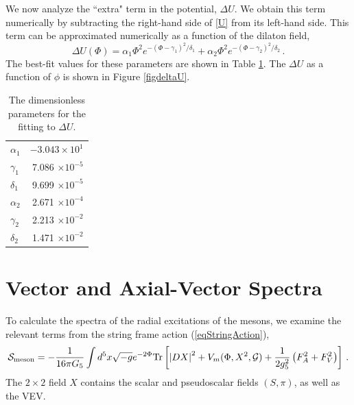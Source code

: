 \documentclass[aps,prd,12pt,nofootinbib]{revtex4}
\newcommand{\be}{\begin{equation}}
\newcommand{\ee}{\end{equation}}
\newcommand{\cS}{\mathcal S}
\begin{document}
We now analyze the ``extra" term in the potential, $\Delta U$. 
We obtain this term numerically by subtracting the right-hand side of \ref{U} from its left-hand side.
This term can be approximated numerically as a function of the dilaton field, 
\be
\Delta U\left(\Phi\right) = \alpha_1 \Phi^2 e^{-\left(\Phi-\gamma_1\right)^2/\delta_1 } +   \alpha_2 \Phi^2 e^{-\left(\Phi-\gamma_2\right)^2/\delta_2 } \, .
\label{eqFit}
\ee
The best-fit values for these parameters are shown in Table \ref{deltaUfit}.  The $\Delta U$ as a function of $\phi$ is shown in Figure \ref{figdeltaU}.
\begin{table}[htb]
\begin{center}
\begin{tabular}{| l | r | }
\hline
$\alpha_1$ & $-3.043 \times 10^1$\\
$\gamma_1$ & 7.086 $\times 10^{-5}$ \\ 
$\delta_1$ & 9.699 $ \times 10^{-5}$\\ 
$\alpha_2$ & 2.671 $ \times 10^{-4}$  \\
$\gamma_2$ & 2.213 $ \times 10^{-2}$ \\
$\delta_2$ & 1.471 $ \times 10^{-2} $\\
  \hline
\end{tabular}
\caption{The dimensionless parameters for the fitting to $\Delta U$.}
\label{deltaUfit}
\end{center}
\end{table}


\section{Vector and Axial-Vector Spectra}

To calculate the spectra of the radial excitations of the mesons, we examine the relevant terms from the string frame action (\ref{eqStringAction}),
\be
\cS_{{\rm meson}}=-\frac{1}{16\pi G_5} \int d^5x \sqrt{-g} e^{-2\Phi}\mathrm{Tr}\left[ \left|DX\right|^2+V_m(\Phi,X^2,\mathcal{G})+\frac{1}{2g_5^2}\left(F_A^2 +F_V^2\right) \right] \, .
\label{eqMesonL}
\ee
The $2 \times 2$ field $X$ contains the scalar and pseudoscalar fields $(S,\pi)$, as well as the VEV.
\end{document}
